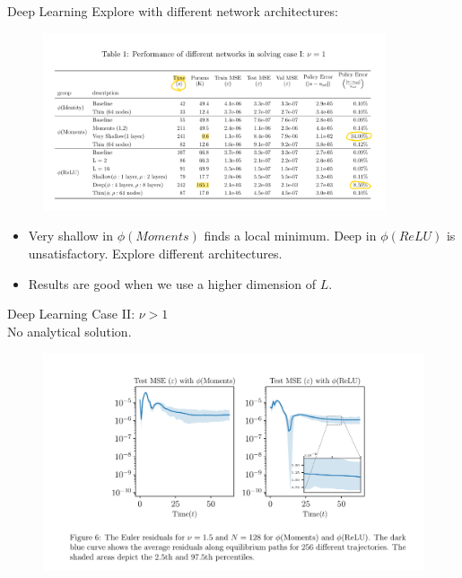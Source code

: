 \documentclass[dvipsnames,mathserif]{beamer}
\begin{document}
{\begin{frame}{Deep Learning}
Explore with different network architectures:
\begin{figure}[h!]
\centering
\includegraphics[width = 0.9\textwidth]{6.png}
\end{figure}
\begin{itemize}
    \item Very shallow in $\phi(Moments)$ finds a local minimum. Deep in $\phi(ReLU)$ is unsatisfactory. Explore different architectures.\\
    \item Results are good when we use a higher dimension of $L$.
\end{itemize}

\end{frame}

\begin{frame}{Deep Learning}
Case II: $\nu > 1$\\
No analytical solution.
\begin{figure}[h!]
\centering
\includegraphics[width = \textwidth]{7.png}
\end{figure}
\end{frame}

}
\end{document}
